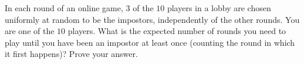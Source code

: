 In each round of an online game, $3$ of the $10$ players in a lobby are chosen uniformly at random to be the impostors, independently of the other rounds. You are one of the $10$ players. What is the expected number of rounds you need to play until you have been an impostor at least once (counting the round in which it first happens)? Prove your answer.
